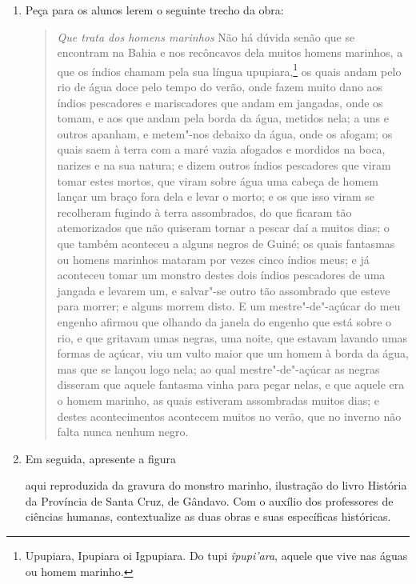 \documentclass[12pt]{extarticle}
\begin{document}
\begin{enumerate}

\item Peça para os alunos lerem o seguinte trecho da obra:


\begin{quote} 
\emph{Que trata dos homens marinhos}
Não há dúvida senão que se encontram na Bahia e nos recôncavos dela muitos homens
marinhos, a que os índios chamam pela sua língua upupiara,\footnote{Upupiara, Ipupiara oi
Igpupiara. Do tupi \textit{îpupi'ara}, aquele que vive nas águas ou homem marinho.} os
quais andam pelo rio de água doce pelo tempo do verão, onde fazem muito dano aos índios
pescadores e mariscadores que andam em jangadas, onde os tomam, e aos que andam pela borda
da água, metidos nela; a uns e outros apanham, e metem"-nos debaixo da água, onde os
afogam; os quais saem à terra com a maré vazia afogados e mordidos na boca, narizes e na
sua natura; e dizem outros índios pescadores que viram tomar estes mortos, que viram sobre
água uma cabeça de homem lançar um braço fora dela e levar o morto; e os que isso viram se
recolheram fugindo à terra assombrados, do que ficaram tão atemorizados que não quiseram
tornar a pescar daí a muitos dias; o que também aconteceu a alguns negros de Guiné; os
quais fantasmas ou homens marinhos mataram por vezes cinco índios meus; e já aconteceu
tomar um monstro destes dois índios pescadores de uma jangada e levarem um, e salvar"-se
outro tão assombrado que esteve para morrer; e alguns morrem disto. E um mestre"-de"-açúcar
do meu engenho afirmou que olhando da janela do engenho que está sobre o rio, e que
gritavam umas negras, uma noite, que estavam lavando umas formas de açúcar, viu um vulto
maior que um homem à borda da água, mas que se lançou logo nela; ao qual mestre"-de"-açúcar
as negras disseram que aquele fantasma vinha para pegar nelas, e que aquele era o homem
marinho, as quais estiveram assombradas muitos dias; e destes acontecimentos acontecem
muitos no verão, que no inverno não falta nunca nenhum negro.
\end{quote}

\item Em seguida, apresente a figura \begin{comment}%
\end{comment} aqui reproduzida da gravura do monstro marinho, ilustração do livro História da Província de Santa Cruz, de Gândavo.
Com o auxílio dos professores de ciências humanas, contextualize as duas obras e suas específicas históricas.



\end{enumerate}
\end{document}
